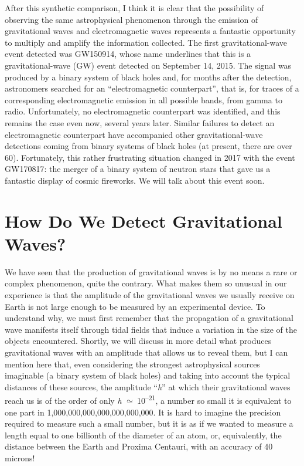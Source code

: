 After this synthetic comparison, I think it is clear that the possibility of observing
the same astrophysical phenomenon through the emission of gravitational waves and
electromagnetic waves represents a fantastic opportunity to multiply and amplify the
information collected. The first gravitational-wave event detected was
GW150914, whose name underlines that this is a gravitational-wave
(GW) event detected on September 14, 2015. The signal was produced by a binary system of
black holes and, for months after the detection, astronomers searched for an
``electromagnetic counterpart'', that is, for traces of a
corresponding electromagnetic emission in all possible bands, from gamma to radio.
Unfortunately, no electromagnetic counterpart was identified, and
this remains the case even now, several years later. Similar failures to detect an
electromagnetic counterpart have accompanied other gravitational-wave detections coming
from binary systems of black holes (at present, there are over 60). Fortunately, this
rather frustrating situation changed in 2017 with the event GW170817:
the merger of a binary system of neutron stars that gave us a fantastic display of
cosmic fireworks. We will talk about this event soon.

\section{How Do We Detect Gravitational Waves?}\label{sec:08-detectors}

We have seen that the production of gravitational waves is by no means a rare or complex
phenomenon, quite the contrary. What makes them so unusual in our experience is that the
amplitude of the gravitational waves we usually receive on Earth is not large enough to
be measured by an experimental device. To understand why, we must first remember that
the propagation of a gravitational wave manifests itself through tidal fields that
induce a variation in the size of the objects encountered. Shortly, we will discuss in
more detail what produces gravitational waves with an amplitude that allows us to reveal
them, but I can mention here that, even considering the strongest astrophysical sources
imaginable (a binary system of black holes) and taking into account the typical
distances of these sources, the amplitude ``\emph{h}'' at which their gravitational
waves reach us is of the order of only \emph{h} \(\simeq \ \)10\textsuperscript{--21}, a
number so small it is equivalent to one part in 1,000,000,000,000,000,000,000. It is
hard to imagine the precision required to measure such a small number, but it is as if
we wanted to measure a length equal to one billionth of the diameter of an atom, or,
equivalently, the distance between the Earth and Proxima Centauri,
with an accuracy of 40 microns!

